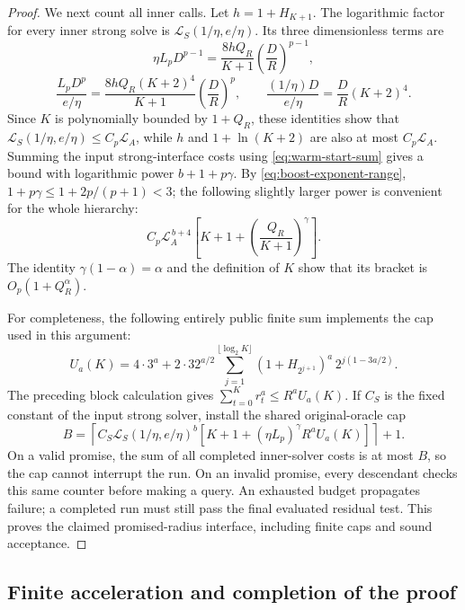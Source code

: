 \documentclass[11pt]{article}
\numberwithin{equation}{section}
\theoremstyle{definition}
\theoremstyle{remark}
\begin{document}
\begin{proof}
We next count all inner calls. Let \(h=1+H_{K+1}\).
The logarithmic factor for every inner strong solve is
\(\mathcal L_S(1/\eta,e/\eta)\). Its three dimensionless terms are
\[
\eta L_pD^{p-1}
=\frac{8hQ_R}{K+1}\left(\frac DR\right)^{p-1},
\]
\[
\frac{L_pD^p}{e/\eta}
=\frac{8hQ_R(K+2)^4}{K+1}\left(\frac DR\right)^p,
\qquad
\frac{(1/\eta)D}{e/\eta}=\frac DR(K+2)^4.
\]
Since \(K\) is polynomially bounded by \(1+Q_R\), these identities
show that
\(\mathcal L_S(1/\eta,e/\eta)\le C_p\mathcal L_A\), while
\(h\) and \(1+\ln(K+2)\) are also at most \(C_p\mathcal L_A\).
Summing the input strong-interface costs using
\eqref{eq:warm-start-sum} gives a bound with logarithmic power
\(b+1+p\gamma\). By \eqref{eq:boost-exponent-range},
\(1+p\gamma\le1+2p/(p+1)<3\); the following slightly larger power
is convenient for the whole hierarchy:
\begin{equation}\label{eq:boost-query-cost}
C_p\mathcal L_A^{\,b+4}
\left[K+1+\left(\frac{Q_R}{K+1}\right)^\gamma\right].
\end{equation}
The identity \(\gamma(1-\alpha)=\alpha\) and the definition of
\(K\) show that its bracket is \(O_p(1+Q_R^\alpha)\).

For completeness, the following entirely public finite sum implements
the cap used in this argument:
\[
U_a(K)=4\cdot3^a+
2\cdot32^{a/2}\sum_{j=1}^{\lfloor\log_2K\rfloor}
 (1+H_{2^{j+1}})^a\,2^{j(1-3a/2)}.
\]
The preceding block calculation gives
\(\sum_{t=0}^{K}r_t^a\le R^aU_a(K)\).
If \(C_S\) is the fixed constant of the input strong solver, install
the shared original-oracle cap
\[
B=\left\lceil
C_S\mathcal L_S(1/\eta,e/\eta)^b
\left[K+1+(\eta L_p)^\gamma R^aU_a(K)\right]
\right\rceil+1.
\]
On a valid promise, the sum of all completed inner-solver costs is at
most \(B\), so the cap cannot interrupt the run. On an invalid
promise, every descendant checks this same counter before making a
query. An exhausted budget propagates failure; a completed run must
still pass the final evaluated residual test. This proves the claimed
promised-radius interface, including finite caps and sound acceptance.
\end{proof}

\subsection{Finite acceleration and completion of the proof}
\end{document}
